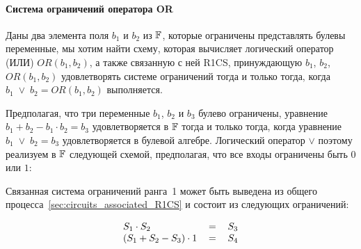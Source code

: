 \paragraph{Система ограничений оператора OR}
\label{def:boolean-or} Даны два элемента поля $b_1$ и $b_2$ из $\mathbb{F}$, которые ограничены представлять булевы переменные, мы хотим найти схему, которая вычисляет логический оператор  (ИЛИ) $OR(b_1,b_2)$, а также связанную с ней R1CS, принуждающую $b_1$, $b_2$, $OR(b_1,b_2)$ удовлетворять системе ограничений тогда и только тогда, когда $b_1\; \vee \; b_2 = OR(b_1,b_2)$ выполняется.

Предполагая, что три переменные $b_1$, $b_2$ и $b_3$ булево ограничены, уравнение $b_1 + b_2 - b_1\cdot b_2 = b_3$ удовлетворяется в $\mathbb{F}$ тогда и только тогда, когда уравнение $b_1 \; \vee \; b_2 = b_3$ удовлетворяется в булевой алгебре. Логический оператор $\vee$ поэтому реализуем в $\mathbb{F}$ следующей схемой, предполагая, что все входы ограничены быть $0$ или $1$:
\begin{center}
\end{center}
Связанная система ограничений ранга~1 может быть выведена из общего процесса~\ref{sec:circuits_associated_R1CS} и состоит из следующих ограничений:

\begin{equation}\label{def:boolean-or_constraints}
\begin{tabular}{lcr}
$S_1 \cdot S_2$ & $=$ & $S_3$\\
$(S_1 + S_2 - S_3)\cdot 1$ &$=$ &$S_4$
\end{tabular}
\end{equation}

